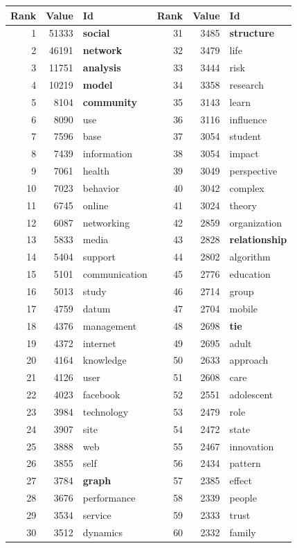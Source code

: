 \documentclass[hyperref={pdfstartview={FitBH -32768},
                         pdfpagemode=FullScreen,
                         plainpages=false,
                         colorlinks=true}
              ]{beamer}
\begin{document}
\begin{frame}[fragile]
\renewcommand{\arraystretch}{0.82}
\tiny
\begin{center}
\begin{tabular}{r|r|l||r|r|l}
Rank&  	Value&  	Id&  	Rank&  	Value&  	Id\\ \hline
1&  	51333&  	\textbf{social}&  	31&  	3485&  	\textbf{structure}\\
2&  	46191&  	\textbf{network}&  	32&  	3479&  	life\\
3&  	11751&         \textbf {analysis}&  	33&  	3444&  	risk\\
4&  	10219&  	\textbf{model}&  	34&  	3358&  	research\\
5&  	8104&  	\textbf{community}&  	35&  	3143&  	learn\\
6&  	8090&  	use&  	36&  	3116&  	influence\\
7&  	7596&  	base&  	37&  	3054&  	student\\
8&  	7439&  	information&  	38&  	3054&  	impact\\
9&  	7061&  	health&  	39&  	3049&  	perspective\\
10&  	7023&  	behavior&  	40&  	3042&  	complex\\
11&  	6745&  	online&  	41&  	3024&  	theory\\
12&  	6087&  	networking&  	42&  	2859&  	organization\\
13&  	5833&  	media&  	43&  	2828&  	\textbf{relationship}\\
14&  	5404&  	support&  	44&  	2802&  	algorithm\\
15&  	5101&  	communication&  	45&  	2776&  	education\\
16&  	5013&  	study&  	46&  	2714&  	group\\
17&  	4759&  	datum&  	47&  	2704&  	mobile\\
18&  	4376&  	management&  	48&  	2698&  	\textbf{tie}\\
19&  	4372&  	internet&  	49&  	2695&  	adult\\
20&  	4164&  	knowledge&  	50&  	2633&  	approach\\
21&  	4126&  	user&  	51&  	2608&  	care\\
22&  	4023&  	facebook&  	52&  	2551&  	adolescent\\
23&  	3984&  	technology&  	53&  	2479&  	role\\
24&  	3907&  	site&  	54&  	2472&  	state\\
25&  	3888&  	web&  	55&  	2467&  	innovation\\
26&  	3855&  	self&  	56&  	2434&  	pattern\\
27&  	3784&  	\textbf{graph}&  	57&  	2385&  	effect\\
28&  	3676&  	performance&  	58&  	2339&  	people\\
29&  	3534&  	service&  	59&  	2333&  	trust\\
30&  	3512&  	dynamics&  	60&  	2332&  	family\\ \hline
\end{tabular}
\end{center}
\end{frame}
\end{document}
